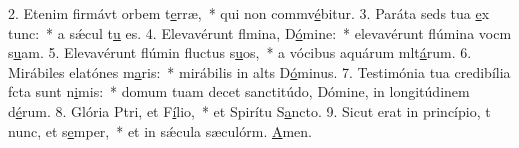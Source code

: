 2. Etenim firmávt orbem t\uline{e}rræ,~* qui non commv\uline{é}bitur.
3. Paráta seds tua \uline{e}x tunc:~* a sǽcul t\uline{u} es.
4. Elevavérunt flmina, D\uline{ó}mine:~* elevavérunt flúmina vocm s\uline{u}am.
5. Elevavérunt flúmin fluctus s\uline{u}os,~* a vócibus aquárum mlt\uline{á}rum.
6. Mirábiles elatónes m\uline{a}ris:~* mirábilis in alts D\uline{ó}minus.
7. Testimónia tua credibília fcta sunt n\uline{i}mis:~* domum tuam decet sanctitúdo, Dómine, in longitúdinem d\uline{é}rum.
8. Glória Ptri, et F\uline{í}lio,~* et Spirítu S\uline{a}ncto.
9. Sicut erat in princípio, t nunc, et s\uline{e}mper,~* et in sǽcula sæculórm. \uline{A}men.
